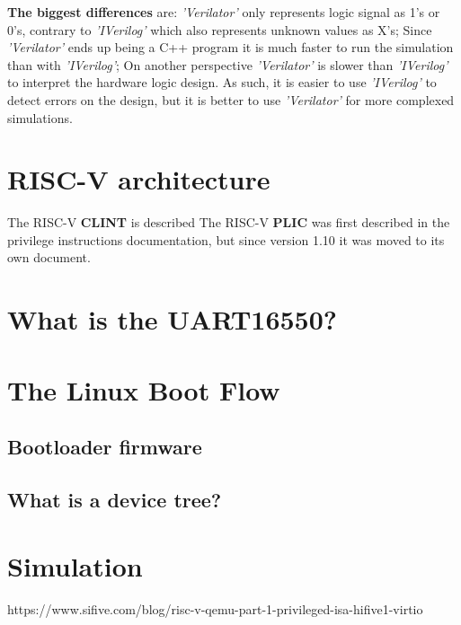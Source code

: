 \textbf{The biggest differences} are: \textit{'Verilator'} only represents logic signal as 1's or 0's, contrary to \textit{'IVerilog'} which also represents unknown values as X's; Since \textit{'Verilator'} ends up being a C++ program it is much faster to run the simulation than with \textit{'IVerilog'}; On another perspective \textit{'Verilator'} is slower than \textit{'IVerilog'} to interpret the hardware logic design.
As such, it is easier to use \textit{'IVerilog'} to detect errors on the design, but it is better to use \textit{'Verilator'} for more complexed simulations.


\section{RISC-V architecture}
The RISC-V \textbf{CLINT} is described
The RISC-V \textbf{PLIC} was first described in the privilege instructions documentation, but since version 1.10 it was moved to its own document.


\section{What is the UART16550?}


\section{The Linux Boot Flow}
\subsection{Bootloader firmware}
\subsection{What is a device tree?}

\section{Simulation}
https://www.sifive.com/blog/risc-v-qemu-part-1-privileged-isa-hifive1-virtio
